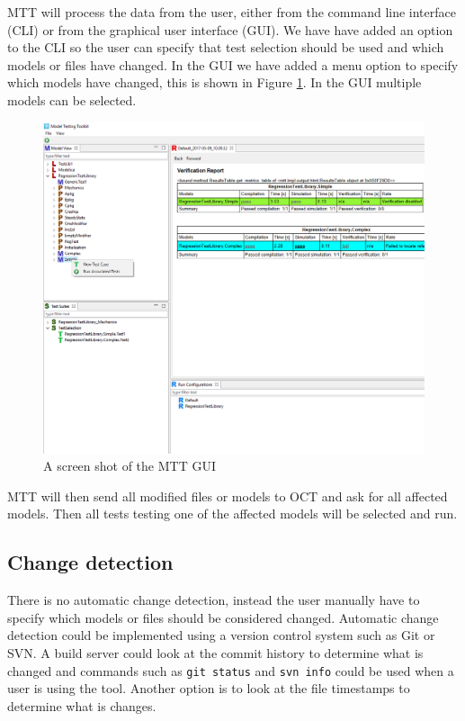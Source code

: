 \documentclass{cslthse-msc}
\begin{document}
MTT will process the data from the user, either from the command line interface (CLI) or from the graphical user interface (GUI). We have have added an option to the CLI so the user can specify that test selection should be used and which models or files have changed. In the GUI we have added a menu option to specify which models have changed, this is shown in Figure \ref{fig:MTTrun}. In the GUI multiple models can be selected.

\begin{figure}[!hbtp]
    \includegraphics[width=1.0\textwidth]{Pictures/MTT_Capture.png}
    \caption{A screen shot of the MTT GUI}
    \label{fig:MTTrun}
\end{figure}

MTT will then send all modified files or models to OCT and ask for all affected models. Then all tests testing one of the affected models will be selected and run.

\subsection{Change detection}
There is no automatic change detection, instead the user manually have to specify which models or files should be considered changed. Automatic change detection could be implemented using a version control system such as Git or SVN. A build server could look at the commit history to determine what is changed and commands such as \texttt{git status} and \texttt{svn info} could be used when a user is using the tool. Another option is to look at the file timestamps to determine what is changes.
\end{document}

